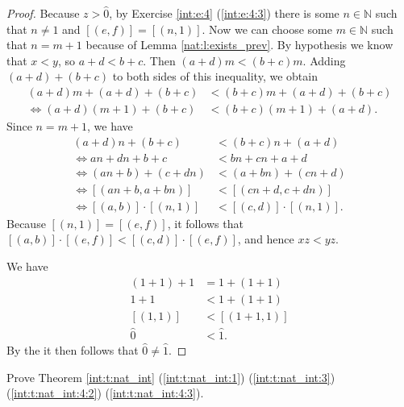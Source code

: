 \begin{proof}
	Because $z > \hat{0}$, by Exercise \ref{int:e:4} (\ref{int:e:4:3}) there is some $n \in \mathbb{N}$ such that $n \not= 1$ and $[(e, f)] = [(n, 1)]$. Now we can choose some $m \in \mathbb{N}$ such that $n = m + 1$ because of Lemma \ref{nat:l:exists_prev}. By hypothesis we know that $x < y$, so $a + d < b + c$. Then $(a + d)m < (b + c)m$. Adding $(a + d) + (b + c)$ to both sides of this inequality, we obtain
	\begin{align*}
		(a + d)m + (a + d) + (b + c)  & < (b + c)m + (a + d) + (b + c) \\
		\iff (a + d)(m + 1) + (b + c) & < (b + c)(m + 1) + (a + d).
	\end{align*}
	Since $n = m + 1$, we have
	\begin{align*}
		(a + d)n + (b + c)           & < (b + c)n + (a + d)       \\
		\iff a n + d n + b + c       & < b n + c n + a + d        \\
		\iff (a n + b) + (c + d n)   & < (a + b n) + (c n + d)    \\
		\iff [(a n + b, a + b n)]    & < [(c n + d, c + d n)]     \\
		\iff [(a, b)] \cdot [(n, 1)] & < [(c, d)] \cdot [(n, 1)].
	\end{align*}
	Because $[(n, 1)] = [(e, f)]$, it follows that $[(a, b)] \cdot [(e, f)] < [(c, d)] \cdot [(e, f)]$, and hence $x z < y z$.

	We have
	\begin{align*}
		(1 + 1) + 1 & = 1 + (1 + 1)  \\
		1 + 1       & < 1 + (1 + 1)  \\
		[(1, 1)]    & < [(1 + 1, 1)] \\
		\hat{0}     & < \hat{1}.
	\end{align*}
	By the  it then follows that $\hat{0} \not= \hat{1}$.
\end{proof}


\Newpage
\begin{exercise} %
	Prove Theorem \ref{int:t:nat_int} (\ref{int:t:nat_int:1}) (\ref{int:t:nat_int:3}) (\ref{int:t:nat_int:4:2}) (\ref{int:t:nat_int:4:3}).
\end{exercise}

